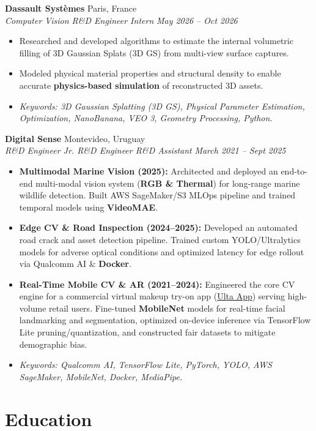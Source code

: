 \documentclass[10pt, a4paper]{article}
\newcommand{\entryheader}[4]{
    \noindent \textbf{#1} \hfill #2 \\
    \textit{#3} \hfill \textit{#4} \vspace{0pt}
}
\begin{document}
\entryheader{Dassault Systèmes}{Paris, France}{Computer Vision R\&D Engineer Intern}{May 2026 -- Oct 2026}
\begin{itemize}
    \item Researched and developed algorithms to estimate the internal volumetric filling of 3D Gaussian Splats (3D GS) from multi-view surface captures.
    \item Modeled physical material properties and structural density to enable accurate \textbf{physics-based simulation} of reconstructed 3D assets.
    \item \textit{Keywords: 3D Gaussian Splatting (3D GS), Physical Parameter Estimation, Optimization, NanoBanana, VEO 3, Geometry Processing, Python.}
\end{itemize}
\vspace{3pt}

\entryheader{Digital Sense}{Montevideo, Uruguay}{R\&D Engineer \textbar{} Jr. R\&D Engineer \textbar{} R\&D Assistant}{March 2021 -- Sept 2025}
\begin{itemize}
    \item \textbf{Multimodal Marine Vision (2025):} Architected and deployed an end-to-end multi-modal vision system (\textbf{RGB \& Thermal}) for long-range marine wildlife detection. Built AWS SageMaker/S3 MLOps pipeline and trained temporal models using \textbf{VideoMAE}.
    \item \textbf{Edge CV \& Road Inspection (2024--2025):} Developed an automated road crack and asset detection pipeline. Trained custom YOLO/Ultralytics models for adverse optical conditions and optimized latency for edge rollout via Qualcomm AI \& \textbf{Docker}.
    \item \textbf{Real-Time Mobile CV \& AR (2021--2024):} Engineered the core CV engine for a commercial virtual makeup try-on app (\href{https://www.ulta.com/company/app?srsltid=AfmBOorrV_A9GKMtuqNiCTeg1_JPuXVPm-JVckez5tHgEYyQP1o90QxV}{Ulta App}) serving high-volume retail users. Fine-tuned \textbf{MobileNet} models for real-time facial landmarking and segmentation, optimized on-device inference via TensorFlow Lite pruning/quantization, and constructed fair datasets to mitigate demographic bias.
    \item \textit{Keywords: Qualcomm AI, TensorFlow Lite, PyTorch, YOLO, AWS SageMaker, MobileNet, Docker, MediaPipe.}
\end{itemize}

\section{Education}
\end{document}
